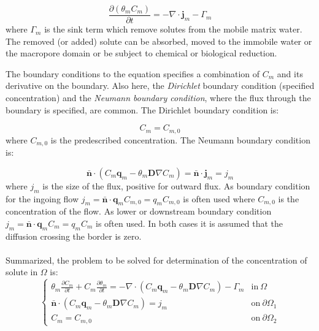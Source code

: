 \documentclass{report}
\begin{document}
\begin{equation}
\frac{\partial (\theta_{m} C_{m})} {\partial t}
   =-\nabla \cdot \mathbf{j}_{m} - \Gamma_{m}
\label{eq:solmassbal_im}
\end{equation}
%
where $\Gamma_{m}$ is the sink term which remove solutes from the
mobile matrix water. The removed (or added) solute can be absorbed,
moved to the immobile water or the macropore domain or be subject to
chemical or biological reduction.

The boundary conditions to the equation specifies a combination of
$C_{m}$ and its derivative on the boundary. Also here, the
\textit{Dirichlet} boundary condition (specified
concentration) and the \textit{Neumann boundary
  condition}, where the flux through the boundary is
specified, are common. The Dirichlet boundary condition is:

\begin{equation}
C_{m}=C_{m,0} \label{eq:Dirichlet_sol}
\end{equation}
%
where $C_{m,0}$ is the predescribed concentration. The Neumann
boundary condition is:

\begin{equation}
 \mathbf{\bar{n}}\cdot (C_{m}\mathbf{q}_{m}-\theta_{m}\mathbf{D}\nabla
 C_{m})=\mathbf{\bar{n}}\cdot \mathbf{j}_{m}=j_{m}
\label{eq:Neumann_sol}
\end{equation}
%
where $j_{m}$ is the size of the flux, positive for outward flux. As
boundary condition for the ingoing flow
$j_{m}=\mathbf{\bar{n}}\cdot\mathbf{q}_{m}C_{m,0}=q_{m}C_{m,0}$ is
often used where $C_{m,0}$ is the concentration of the flow. As
lower or downstream boundary condition
$j_{m}=\mathbf{\bar{n}}\cdot\mathbf{q}_{m}C_{m}=q_{m}C_{m}$ is often
used. In both cases it is assumed that the diffusion crossing the border is zero.\\
\\
Summarized, the problem to be solved for determination of the
concentration of solute in $\Omega$ is:
%
\begin{equation}
\begin{cases}
 \theta_{m} \frac{\partial C_{m}}{\partial t} + C_{m} \frac{\partial
  \theta_{m}}{\partial t} =  -\nabla \cdot(C_{m}
  \mathbf{q}_{m}-\theta_{m}
  \mathbf{D}\nabla C_{m})- \Gamma_{m} &
  \text{in} \ \Omega \\
 \mathbf{\bar{n}}\cdot (C_{m}\mathbf{q}_{m}-\theta_{m}\mathbf{D}\nabla C_{m})=j_{m} &
  \text{on}\  \partial\Omega_1 \\
 C_{m}=C_{m,0} & \text{on}\ \partial\Omega_2
\end{cases}
\label{eq:solutemovement}
\end{equation}
%
\end{document}
